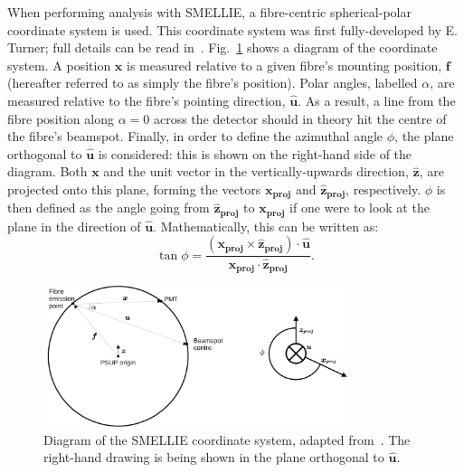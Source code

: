 When performing analysis with SMELLIE, a fibre-centric spherical-polar coordinate system is used. This coordinate system was first fully-developed by E. Turner; full details can be read in~\cite{turnerMeasurementScatteringCharacteristics2022}. Fig.~\ref{fig:smellie_coordinate_system} shows a diagram of the coordinate system. A position $\bm{x}$ is measured relative to a given fibre's mounting position, $\bm{f}$ (hereafter referred to as simply the fibre's position). Polar angles, labelled $\alpha$, are measured relative to the fibre's pointing direction, $\bm{\hat{u}}$. As a result, a line from the fibre position along $\alpha = 0$ across the detector should in theory hit the centre of the fibre's beamspot. Finally, in order to define the azimuthal angle $\phi$, the plane orthogonal to $\bm{\hat{u}}$ is considered: this is shown on the right-hand side of the diagram. Both $\bm{x}$ and the unit vector in the vertically-upwards direction, $\bm{\hat{z}}$, are projected onto this plane, forming the vectors $\bm{x_{proj}}$ and $\bm{\hat{z}_{proj}}$, respectively. $\phi$ is then defined as the angle going from $\bm{\hat{z}_{proj}}$ to $\bm{x_{proj}}$ if one were to look at the plane in the direction of $\bm{\hat{u}}$. Mathematically, this can be written as:
\begin{equation}
    \tan\phi = \frac{
        \left(\bm{x_{proj}}\times\bm{\hat{z}_{proj}}\right)\cdot\bm{\hat{u}}
        }{\bm{x_{proj}}\cdot\bm{\hat{z}_{proj}}}.
\end{equation}

\begin{figure}
    \centering
    \includegraphics[width=0.8\textwidth]{3_SMELLIEHardware/images/smellie_coordinate_system.pdf}
    \caption[Diagram of the SMELLIE coordinate system]
    {Diagram of the SMELLIE coordinate system, adapted from~\cite{turnerMeasurementScatteringCharacteristics2022}. The right-hand drawing is being shown in the plane orthogonal to $\bm{\hat{u}}$.}
    \label{fig:smellie_coordinate_system}
\end{figure}

